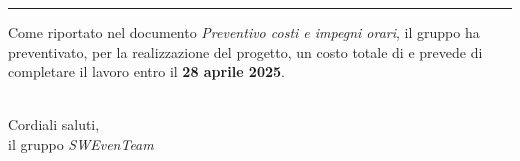 \documentclass[10pt]{article}
\begin{document}
    \begin{center}
        \rule{0.7\linewidth}{0.2pt}
    \end{center}

    \noindent Come riportato nel documento \textit{Preventivo costi e impegni orari}, il gruppo ha preventivato, per la realizzazione del progetto, un costo totale di \textbf{} e prevede di completare il lavoro entro il \textbf{28 aprile 2025}.
    \\
    \\
    \begin{flushright}
        Cordiali saluti, \\
        il gruppo \textit{SWEvenTeam}
    \end{flushright}

    \newpage
     
\end{document}
